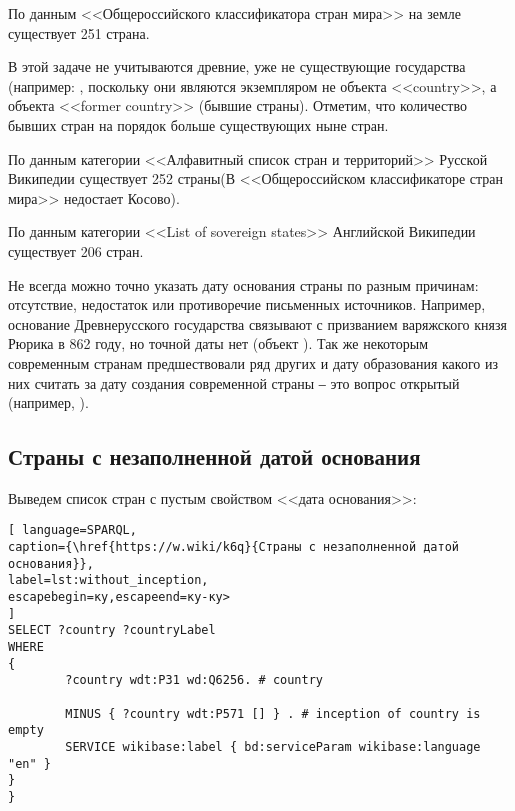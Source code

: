 По данным <<Общероссийского классификатора стран мира>> на земле существует 251 страна.

В этой задаче не учитываются древние, уже не существующие государства (например: , поскольку они являются экземпляром не объекта <<country>>, а объекта <<former country>> (бывшие страны). Отметим, что количество бывших стран на порядок больше существующих ныне стран.

По данным категории <<Алфавитный список стран и территорий>> Русской Википедии существует 252 страны(В <<Общероссийском классификаторе стран мира>> недостает Косово).

По данным категории <<List of sovereign states>> Английской Википедии существует 206 стран.

Не всегда можно точно указать дату основания страны по разным причинам: отсутствие, недостаток или противоречие письменных источников. Например, основание Древнерусского государства связывают с призванием варяжского князя Рюрика в 862 году, но точной даты нет (объект ). Так же некоторым современным странам предшествовали ряд других и дату образования какого из них считать за дату создания современной страны ‒ это вопрос открытый (например, ).

\subsection{Страны с незаполненной датой основания}

Выведем список стран с пустым свойством <<дата основания>>:



\begin{lstlisting}[ language=SPARQL, 
caption={\href{https://w.wiki/k6q}{Страны с незаполненной датой основания}},
label=lst:without_inception, 
escapebegin=ку,escapeend=ку-ку>
]
SELECT ?country ?countryLabel 
WHERE
{
		?country wdt:P31 wd:Q6256. # country
		
		MINUS { ?country wdt:P571 [] } . # inception of country is empty
		SERVICE wikibase:label { bd:serviceParam wikibase:language "en" }
}
}
\end{lstlisting}


